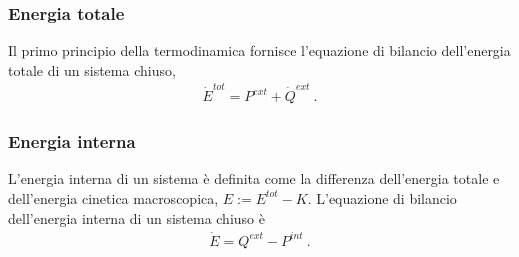 \documentclass[letterpaper,10pt,italian]{jupyterBook}
\begin{document}
\subsubsection{Energia totale}
\label{\detokenize{ch/circuits-electromechanic:energia-totale}}
\sphinxAtStartPar
Il primo principio della termodinamica fornisce l’equazione di bilancio dell’energia totale di un sistema chiuso,
\begin{equation*}
\begin{split}\dot{E}^{tot} = P^{ext} + \dot{Q}^{ext} \ .\end{split}
\end{equation*}

\subsubsection{Energia interna}
\label{\detokenize{ch/circuits-electromechanic:energia-interna}}
\sphinxAtStartPar
L’energia interna di un sistema è definita come la differenza dell’energia totale e dell’energia cinetica macroscopica, \(E := E^{tot} - K\). L’equazione di bilancio dell’energia interna di un sistema chiuso è
\begin{equation*}
\begin{split}\dot{E} = Q^{ext} - P^{int} \ .\end{split}
\end{equation*}
\end{document}
